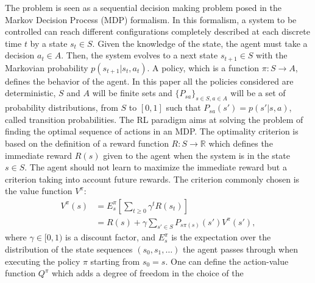 \documentclass{article}
\begin{document}
The problem is seen as a sequential decision making problem posed in
the Markov Decision Process (MDP) formalism. In this formalism, a
system to be controlled can reach different configurations
completely described at each discrete time $t$ by a state $s_t \in
S$. Given the knowledge of the state, the agent must take a decision
$a_t\in A$. Then, the system evolves to a next state $s_{t+1} \in S$
with the Markovian probability $p(s_{t+1}|s_t, a_t)$. %
A policy, which
is a function $\pi: S\rightarrow A$, defines the behavior of the
agent. In this paper all the policies considered are deterministic,
$S$ and $A$ will be finite sets and $\{P_{sa}\}_{s\in S,a\in A}$
will be a set of probability distributions, from $S$ to $[0,1]$ such
that $P_{sa}(s')=p(s'|s, a)$, called transition probabilities.
%
%
The RL paradigm aims at solving the problem of finding the optimal
sequence of actions in an MDP. The optimality criterion is based on
the definition of a reward function $R: S \rightarrow \mathbb{R}$
which defines the immediate reward $R(s)$ given to the agent when
the system is in the state $s \in S$. The agent should not learn to
maximize the immediate reward but a criterion taking into account
future rewards. The criterion commonly chosen is the value function
$V^\pi$:
%
\begin{align}
\label{Vdef.eqn} V^\pi(s) & = E^\pi_s[\sum_{t\geq0}\gamma^tR(s_t)]\\
& = R(s) + \gamma\sum_{s'\in S}P_{s\pi(s)}(s') V^\pi(s'),
\end{align}
%
where $\gamma \in [0,1)$ is a discount factor, and $E^\pi_s$ is the
expectation over the distribution of the state sequences
$(s_0,s_1,\dots)$ the agent passes through when executing the policy
$\pi$ starting from $s_0=s$. One can define the action-value
function $Q^\pi$ which adds a degree of freedom in the choice of the
\end{document}
